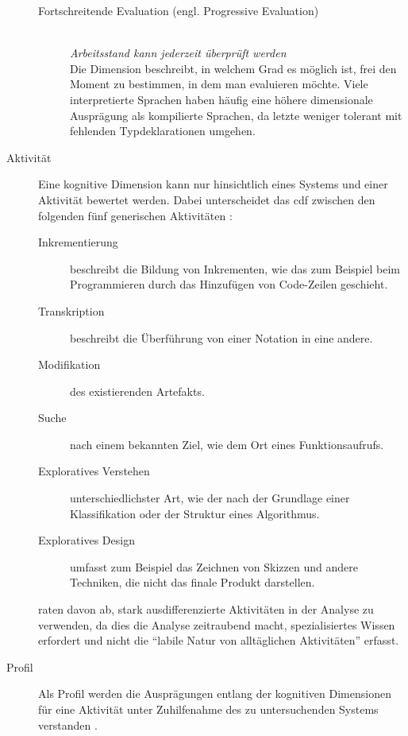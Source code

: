 \begin{important}
\begin{description}
\begin{description}
        \item[Fortschreitende Evaluation (engl. Progressive Evaluation)] \hfill \\ \textit{Arbeitsstand kann jederzeit überprüft werden}\\
        Die Dimension beschreibt, in welchem Grad es möglich ist, frei den Moment zu bestimmen, in dem man evaluieren möchte. Viele interpretierte Sprachen haben häufig eine höhere dimensionale Ausprägung als kompilierte Sprachen, da letzte weniger tolerant mit fehlenden Typdeklarationen umgehen.
    \end{description}
    
\item[Aktivität] Eine kognitive Dimension kann nur hinsichtlich eines Systems und einer Aktivität bewertet werden. Dabei unterscheidet das \gls{cdf} zwischen den folgenden fünf generischen Aktivitäten \citep{carroll2003hci}:
    \begin{description}
        \item[Inkrementierung] beschreibt die Bildung von Inkrementen, wie das zum Beispiel beim Programmieren durch das Hinzufügen von Code-Zeilen geschieht. 
        \item[Transkription] beschreibt die Überführung von einer Notation in eine andere.
        \item[Modifikation] des existierenden Artefakts.
        \item[Suche] nach einem bekannten Ziel, wie dem Ort eines Funktionsaufrufs.
        \item[Exploratives Verstehen] unterschiedlichster Art, wie der nach der Grundlage einer Klassifikation oder der Struktur eines Algorithmus.
        \item[Exploratives Design] umfasst zum Beispiel das Zeichnen von Skizzen und andere Techniken, die nicht das finale Produkt darstellen.
    \end{description}
    \cite{carroll2003hci} raten davon ab, stark ausdifferenzierte Aktivitäten in der Analyse zu verwenden, da dies die Analyse zeitraubend macht, spezialisiertes Wissen erfordert und nicht die ``labile Natur von alltäglichen Aktivitäten'' erfasst. 

\item[Profil] Als Profil werden die Ausprägungen entlang der kognitiven Dimensionen für eine Aktivität unter Zuhilfenahme des zu untersuchenden Systems verstanden \citep{carroll2003hci}.


\end{description}
\end{important}
